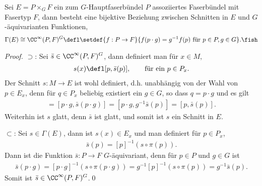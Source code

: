 \documentclass[%
	paper=a5,%
	fleqn,%
	DIV=18,%
	BCOR=0mm,
	fontsize=11pt,
	titlepage=false,%
	bibliography=totoc,
	DIV=18,%
	twoside=true,
	pdftitle=Riemannsche Geometrie,
	pdfauthor=Uwe Semmelmann,
	numbers=noendperiod]%
	{scrbook}
\begin{document}
\begin{lem}
Sei $E = P\times_G F$ ein zum $G$-Hauptfaserbündel $P$ assoziiertes
Faserbündel mit Fasertyp $F$, dann besteht eine bijektive Beziehung zwischen
Schnitten in $E$ und $G$-äquivarianten Funktionen,
\begin{align*}
\Gamma(E) \cong \CC^\infty(P,F)^G \defl
\setdef{f : P\to F}{f(p\cdot g) = g^{-1}f(p)\text{ für }p\in P,g\in G}.\fish
\end{align*}
\end{lem}
\begin{proof}
$\supset$: Sei $\bar{s}\in \CC^\infty(P,F)^G$, dann definiert man für $x\in M$,
\begin{align*}
s(x) \defl [p,\bar{s}(p)],\qquad \text{für ein }p\in P_x.
\end{align*}
Der Schnitt $s:M\to E$ ist wohl definiert, d.h. unabhängig von der Wahl von $p \in E_x$,
denn für $q\in P_x$ beliebig existiert ein
$g\in G$, so dass $q = p\cdot g$ und es gilt
\begin{align*}
[q,\bar{s}(q)] = [p\cdot g,\bar{s}(p\cdot g)]
= [p\cdot g,g^{-1}\bar{s}(p)] = [p,\bar{s}(p)].
\end{align*}
Weiterhin ist $s$ glatt, denn $\bar{s}$ ist glatt, und somit ist $s$ ein Schnitt
in $E$.

$\subset$: Sei $s\in \Gamma(E)$, dann ist $s(x) \in E_x$ und man definiert für
$p\in P_x$,
\begin{align*}
\bar{s}(p) = [p]^{-1}(s\circ \pi(p)). 
\end{align*}
Dann ist die Funktion $\bar{s}:P\to F$ $G$-äquivariant, denn für $p\in P$ und
$g\in G$ ist
\begin{align*}
\bar{s}(p\cdot g) = [p\cdot g]^{-1}(s\circ \pi(p\cdot g))
= g^{-1}[p]^{-1}(s\circ \pi(p)) = g^{-1}\bar{s}(p).
\end{align*} 
Somit ist $\bar{s}\in \CC^\infty(P,F)^G$.\qed
\end{proof}
\end{document}
